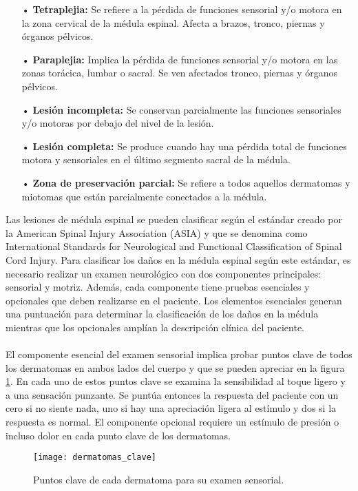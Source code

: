 \begin{itemize}
\item[•] \textbf{Tetraplejia:} Se refiere a la pérdida de funciones sensorial y/o motora en la zona cervical de la médula espinal. Afecta a brazos, tronco, piernas y órganos pélvicos.
\item[•] \textbf{Paraplejia:} Implica la pérdida de funciones sensorial y/o motora en las zonas torácica, lumbar o sacral. Se ven afectados tronco, piernas y órganos pélvicos.
\item[•] \textbf{Lesión incompleta:} Se conservan parcialmente las funciones sensoriales y/o motoras por debajo del nivel de la lesión.
\item[•] \textbf{Lesión completa:} Se produce cuando hay una pérdida total de funciones motora y sensoriales en el último segmento sacral de la médula.
\item[•] \textbf{Zona de preservación parcial:} Se refiere a todos aquellos dermatomas y miotomas que están parcialmente conectados a la médula.
\end{itemize}

Las lesiones de médula espinal se pueden clasificar según el estándar creado por la American Spinal Injury Association (ASIA)\cite{ASIA} y que se denomina como International Standards for Neurological and Functional Classification of Spinal Cord Injury. Para clasificar los daños en la médula espinal según este estándar, es necesario realizar un examen neurológico con dos componentes principales: sensorial y motriz. Además, cada componente tiene pruebas esenciales y opcionales que deben realizarse en el paciente. Los elementos esenciales generan una puntuación para determinar la clasificación de los daños en la médula mientras que los opcionales amplían la descripción clínica del paciente\cite{sci_clasificacion}.
\\
\\
El componente esencial del examen sensorial implica probar puntos clave de todos los dermatomas en ambos lados del cuerpo y que se pueden apreciar en la figura \ref{fig:dermatomas_clave}. En cada uno de estos puntos clave se examina la sensibilidad al toque ligero y a una sensación punzante. Se puntúa entonces la respuesta del paciente con un cero si no siente nada, uno si hay una apreciación ligera al estímulo y dos si la respuesta es normal. El componente opcional requiere un estímulo de presión o incluso dolor en cada punto clave de los dermatomas.\\

\begin{figure}[!htb]
\centering
\texttt{[image: dermatomas\_clave]}
  \caption{Puntos clave de cada dermatoma para su examen sensorial\cite{dermatomas_puntos}.}\label{fig:dermatomas_clave}
\end{figure}

